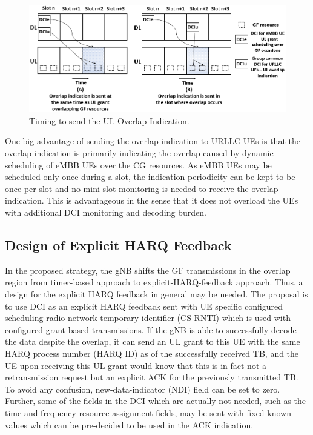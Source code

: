\documentclass[conference]{IEEEtran}
\begin{document}
\begin{figure}[htbp]
\centerline{\includegraphics[scale=0.24]{fig4.PNG}}
\caption{Timing to send the UL Overlap Indication.}
\label{fig4}
\vspace{-3mm}
\end{figure}

One big advantage of sending the overlap indication to URLLC UEs is that the overlap indication is primarily indicating the overlap caused by dynamic scheduling of eMBB UEs over the CG resources. As eMBB UEs may be scheduled only once during a slot, the indication periodicity can be kept to be once per slot and no mini-slot monitoring is needed to receive the overlap indication. This is advantageous in the sense that it does not overload the UEs with additional DCI monitoring and decoding burden. 

\subsection{Design of Explicit HARQ Feedback}\label{IIDD}
In the proposed strategy, the gNB shifts the GF transmissions in the overlap region from timer-based approach to explicit-HARQ-feedback approach. Thus, a design for the explicit HARQ feedback in general may be needed. The proposal is to use DCI as an explicit HARQ feedback sent with UE specific configured scheduling-radio network temporary identifier (CS-RNTI) which is used with configured grant-based transmissions. If the gNB is able to successfully decode the data despite the overlap, it can send an UL grant to this UE with the same HARQ process number (HARQ ID) as of the successfully received TB, and the UE upon receiving this UL grant would know that this is in fact not a retransmission request but an explicit ACK for the previously transmitted TB. To avoid any confusion, new-data-indicator (NDI) field can be set to zero. Further, some of the fields in the DCI which are actually not needed, such as the time and frequency resource assignment fields, may be sent with fixed known values which can be pre-decided to be used in the ACK indication.
\end{document}
